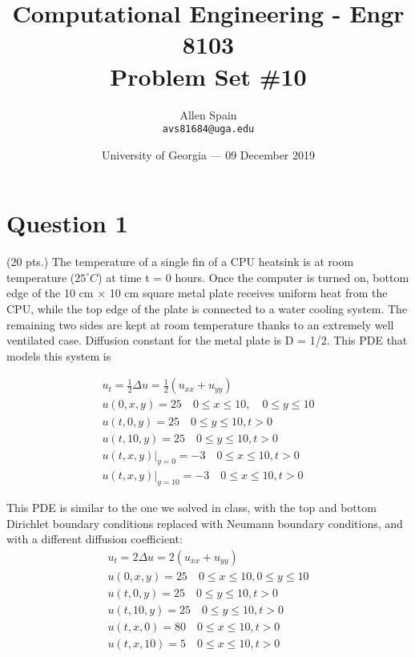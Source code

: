 \documentclass{article}
\title{Computational Engineering - Engr 8103 \\ Problem Set \#10} %
\author{Allen Spain\\ \texttt{avs81684@uga.edu}} %
\date{University of Georgia --- 09 December 2019 } %
\begin{document}
\maketitle %


\section*{Question 1} %
(20 pts.) The temperature of a single fin of a CPU heatsink is at room temperature ($ 25^{\circ}C$) at time t = 0 hours. Once the computer is turned on, bottom edge of the 10 cm × 10 cm square metal plate receives uniform heat from the CPU, while the top edge of the plate is connected to a water cooling system. The remaining two sides are kept at room temperature thanks to an extremely well ventilated case. Diffusion constant for the metal plate is D = 1/2. This PDE that models this system is



\begin{gather*}
  u_{t} = \frac{1}{2}\Delta u = \frac{1}{2}(u_{xx} + u_{yy})\\
  u(0,x,y) = 25 \quad 0 \leq x \leq 10, \quad 0 \leq y \leq 10 \\
  u(t,0,y) = 25 \quad 0 \leq y \leq 10, t > 0 \\
  u(t,10,y) = 25 \quad 0 \leq y \leq 10, t > 0 \\
  u(t,x,y)|_{y = 0} = -3 \quad 0 \leq x \leq 10, t > 0 \\
  u(t,x,y)|_{y = 10} = -3 \quad 0 \leq x \leq 10, t > 0
\end{gather*}

This PDE is similar to the one we solved in class, with the top and bottom Dirichlet boundary conditions replaced with Neumann boundary conditions, and with a different diffusion coefficient: \\

\begin{gather*}
  u_{t} = 2\Delta u = 2(u_{xx} + u_{yy})\\
  u(0,x,y) = 25 \quad 0 \leq  x \leq 10, 0 \leq y \leq 10 \\
  u(t,0,y) = 25 \quad 0 \leq y \leq 10, t > 0 \\
  u(t,10,y) = 25 \quad 0 \leq y \leq 10, t > 0 \\
  u(t,x,0) = 80 \quad 0 \leq x \leq 10, t > 0 \\
  u(t,x,10) = 5 \quad 0 \leq x \leq 10, t > 0
\end{gather*}
\end{document}
